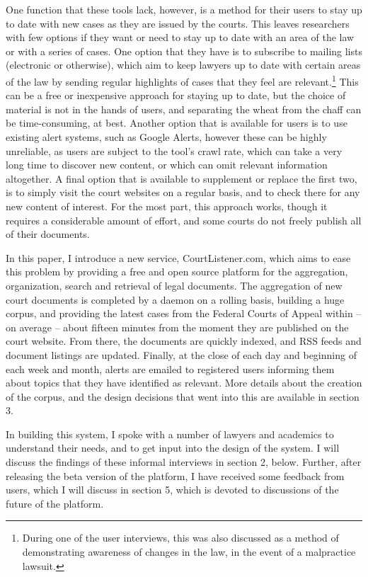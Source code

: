 One function that these tools lack, however, is a method for their users to stay up to date with new cases as they are issued by the courts. This leaves researchers with few options if they want or need to stay up to date with an area of the law or with a series of cases. One option that they have is to subscribe to mailing lists (electronic or otherwise), which aim to keep lawyers up to date with certain areas of the law by sending regular highlights of cases that they feel are relevant.\footnote{During one of the user interviews, this was also discussed as a method of demonstrating awareness of changes in the law, in the event of a malpractice lawsuit.} This can be a free or inexpensive approach for staying up to date, but the choice of material is not in the hands of users, and separating the wheat from the chaff can be time-consuming, at best. Another option that is available for users is to use existing alert systems, such as Google Alerts, however these can be highly unreliable, as users are subject to the tool's crawl rate, which can take a very long time to discover new content, or which can omit relevant information altogether. A final option that is available to supplement or replace the first two, is to simply visit the court websites on a regular basis, and to check there for any new content of interest. For the most part, this approach works, though it requires a considerable amount of effort, and some courts do not freely publish all of their documents.

In this paper, I introduce a new service, CourtListener.com, which aims to ease this problem by providing a free and open source platform for the aggregation, organization, search and retrieval of legal documents. The aggregation of new court documents is completed by a daemon on a rolling basis, building a huge corpus, and providing the latest cases from the Federal Courts of Appeal within -- on average -- about fifteen minutes from the moment they are published on the court website. From there, the documents are quickly indexed, and RSS feeds and document listings are updated. Finally, at the close of each day and beginning of each week and month, alerts are emailed to registered users informing them about topics that they have identified as relevant. More details about the creation of the corpus, and the design decisions that went into this are available in section 3.

In building this system, I spoke with a number of lawyers and academics to understand their needs, and to get input into the design of the system. I will discuss the findings of these informal interviews in section 2, below. Further, after releasing the beta version of the platform, I have received some feedback from users, which I will discuss in section 5, which is devoted to discussions of the future of the platform.
